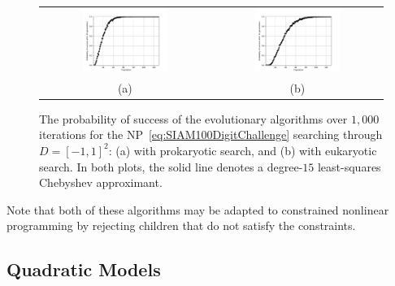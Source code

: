 \begin{figure}[htbp]
\begin{center}
\begin{tabular}{cc}
\hspace*{-0.5cm}\includegraphics[width=0.525\textwidth]{EvolutionaryAlgorithm1prob}&
\hspace*{-0.5cm}\includegraphics[width=0.525\textwidth]{EvolutionaryAlgorithm2prob}\\
(a) & (b)\\
\end{tabular}
\caption{The probability of success of the evolutionary algorithms over $1,000$ iterations for the NP~\eqref{eq:SIAM100DigitChallenge} searching through $D=[-1,1]^2$: (a) with prokaryotic search, and (b) with eukaryotic search. In both plots, the solid line denotes a degree-$15$ least-squares Chebyshev approximant.}
\label{figure:EvolutionaryAlgorithmProbability}
\end{center}
\end{figure}

Note that both of these algorithms may be adapted to constrained nonlinear programming by rejecting children that do not satisfy the constraints.

\subsection{Quadratic Models}

